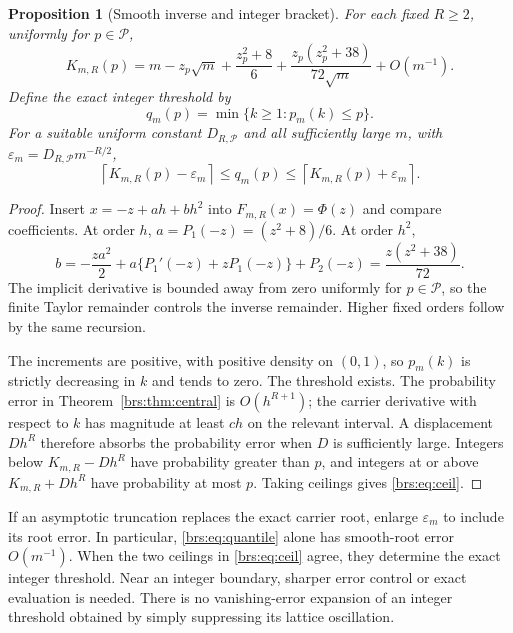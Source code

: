 \documentclass[11pt]{article}
\numberwithin{equation}{section}
\newtheorem{proposition}[theorem]{Proposition}
\theoremstyle{remark}\newtheorem{remark}[theorem]{Remark}
\begin{document}
\begin{proposition}[Smooth inverse and integer bracket]\label{brs:prop:quantile}
For each fixed $R\geq2$, uniformly for $p\in\mathcal P$,
\begin{equation}\label{brs:eq:quantile}
 K_{m,R}(p)=m-z_p\sqrt m+\frac{z_p^2+8}{6}
 +\frac{z_p(z_p^2+38)}{72\sqrt m}+O(m^{-1}).
\end{equation}
Define the exact integer threshold by
\[
 q_m(p)=\min\{k\geq1:p_m(k)\leq p\}.
\]
For a suitable uniform constant $D_{R,\mathcal P}$ and all sufficiently
large $m$, with $\varepsilon_m=D_{R,\mathcal P}m^{-R/2}$,
\begin{equation}\label{brs:eq:ceil}
 \left\lceil K_{m,R}(p)-\varepsilon_m\right\rceil
 \leq q_m(p)\leq
 \left\lceil K_{m,R}(p)+\varepsilon_m\right\rceil.
\end{equation}
\end{proposition}
\begin{proof}
Insert $x=-z+ah+bh^2$ into $F_{m,R}(x)=\Phi(z)$ and compare coefficients.
At order $h$, $a=P_1(-z)=(z^2+8)/6$.  At order $h^2$,
\[
 b=-\frac{za^2}{2}
   +a\{P_1'(-z)+zP_1(-z)\}+P_2(-z)
   =\frac{z(z^2+38)}{72}.
\]
The implicit derivative is bounded away from zero uniformly for
$p\in\mathcal P$, so the finite Taylor remainder controls the inverse
remainder.  Higher fixed orders follow by the same recursion.

The increments are positive, with positive density on $(0,1)$, so
$p_m(k)$ is strictly decreasing in $k$ and tends to zero.  The threshold
exists.  The probability error in Theorem~\ref{brs:thm:central} is
$O(h^{R+1})$; the carrier derivative with respect to $k$ has magnitude at
least $ch$ on the relevant interval.  A displacement $Dh^R$ therefore
absorbs the probability error when $D$ is sufficiently large.  Integers
below $K_{m,R}-Dh^R$ have probability greater than $p$, and integers at
or above $K_{m,R}+Dh^R$ have probability at most $p$.  Taking ceilings
gives \eqref{brs:eq:ceil}.
\end{proof}

If an asymptotic truncation replaces the exact carrier root, enlarge
$\varepsilon_m$ to include its root error.  In particular,
\eqref{brs:eq:quantile} alone has smooth-root error $O(m^{-1})$.
When the two ceilings in \eqref{brs:eq:ceil} agree, they determine the exact
integer threshold.  Near an integer boundary, sharper error control or
exact evaluation is needed.  There is no vanishing-error expansion of an
integer threshold obtained by simply suppressing its lattice oscillation.
\end{document}
